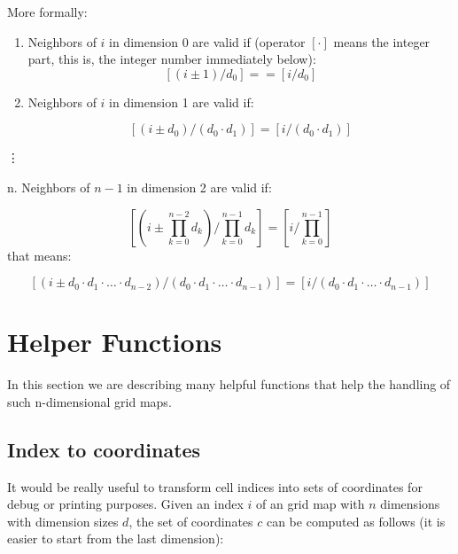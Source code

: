 \documentclass[12pt]{article}
\begin{document}
More formally:

\begin{enumerate}
 \item Neighbors of $i$ in dimension 0 are valid if (operator $[\cdot]$ means the integer part, this is, the integer number immediately below):
  \begin{equation}
   \left[(i\pm1)/d_0\right] == \left[i/d_0\right]
  \end{equation}

 \item Neighbors of $i$ in dimension 1 are valid if:
 
   \begin{equation}
	\left[(i \pm d_0) / (d_0\cdot d_1)\right] = \left[i/(d_0\cdot d_1)\right] 
   \end{equation}
      
\end{enumerate}

\indent   \vdots
   
\indent n. Neighbors of $n-1$ in dimension 2 are valid if:
 
   \begin{equation}
	\left[(i \pm \prod_{k=0}^{n-2}d_k) / \prod_{k=0}^{n-1}d_k\right] = \left[i/\prod_{k=0}^{n-1}\right]
	\label{eq:nd_check}
      \end{equation}
     \indent\indent that means:
      
         \begin{equation}
	\left[(i \pm d_0\cdot d_1 \cdot \dots \cdot d_{n-2}) / (d_0\cdot d_1 \cdot \dots \cdot d_{n-1})\right] = \left[i/(d_0\cdot d_1 \cdot \dots \cdot d_{n-1})\right]
      \end{equation}
      

\section{Helper Functions}\label{sec:helper}
In this section we are describing many helpful functions that help the handling of such n-dimensional grid maps.

\subsection{Index to coordinates}
It would be really useful to transform cell indices into sets of coordinates for debug or printing purposes. Given an index $i$ of an
grid map with $n$ dimensions with dimension sizes $d$, the set of coordinates $c$ can be computed as follows (it is easier to start from
the last dimension):
\end{document}
